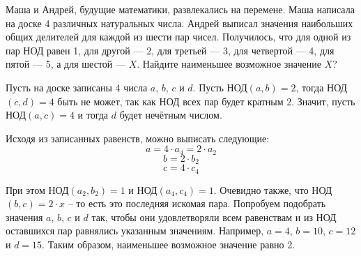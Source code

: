
Маша и Андрей, будущие математики, развлекались на перемене. Маша написала на доске 4 различных натуральных числа. Андрей выписал значения наибольших общих делителей для каждой из шести пар чисел. Получилось, что для одной из пар НОД  равен 1, для другой — 2, для третьей — 3, для четвертой — 4, для пятой — 5, а для шестой — $X$. Найдите наименьшее возможное значение $X$?

\solutionSection

Пусть на доске записаны 4 числа $a$, $b$, $c$ и $d$. Пусть НОД$(a, b) = 2$, тогда НОД$(c, d) = 4$ быть не может, так как НОД всех пар будет кратным 2. Значит, пусть НОД$(a, c) = 4$ и тогда $d$ будет нечётным числом.

Исходя из записанных равенств, можно выписать следующие:
$$a = 4\cdot a_4 = 2 \cdot a_2$$
$$b = 2\cdot b_2$$
$$c = 4\cdot c_4$$

При этом НОД$(a_2, b_2) = 1$ и НОД$(a_4, c_4) = 1$. Очевидно также, что НОД$(b, c) = 2 \cdot x$ -- то есть это последняя искомая пара. Попробуем подобрать значения $a$, $b$, $c$ и $d$ так, чтобы они удовлетворяли всем равенствам и из НОД оставшихся пар равнялись указанным значениям. Например, $a = 4$, $b = 10$, $c = 12$ и $d = 15$. Таким образом, наименьшее возможное значение равно 2.

